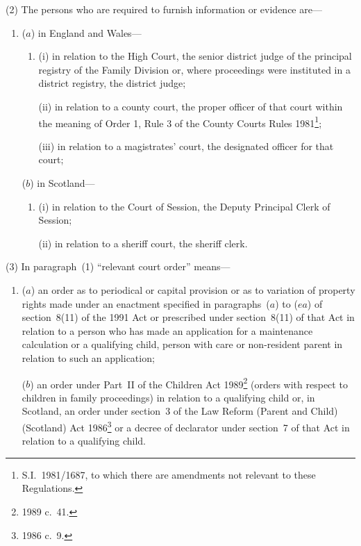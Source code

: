 \documentclass[12pt,a4paper]{article}
\begin{document}
(2) The persons who are required to furnish information or evidence are—
\begin{enumerate}\item[]
($a$) in England and Wales—
\begin{enumerate}\item[]
(i) in relation to the High Court, the senior district judge of the principal registry of the Family Division or, where proceedings were instituted in a district registry, the district judge;

(ii) in relation to a county court, the proper officer of that court within the meaning of Order 1, Rule 3 of the County Courts Rules 1981\footnote{S.I.~1981/1687, to which there are amendments not relevant to these Regulations.};

(iii) in relation to a magistrates’ court, the designated officer for that court;
\end{enumerate}

($b$) in Scotland—
\begin{enumerate}\item[]
(i) in relation to the Court of Session, the Deputy Principal Clerk of Session;

(ii) in relation to a sheriff court, the sheriff clerk.
\end{enumerate}
\end{enumerate}

(3) In paragraph~(1) “relevant court order” means—
\begin{enumerate}\item[]
($a$) an order as to periodical or capital provision or as to variation of property rights made under an enactment specified in paragraphs~($a$)  to ($ea$)  of section~8(11) of the 1991 Act or prescribed under section~8(11) of that Act in relation to a person who has made an application for a maintenance calculation or a qualifying child, person with care or non-resident parent in relation to such an application;

($b$) an order under Part~II of the Children Act 1989\footnote{1989 c.~41.} (orders with respect to children in family proceedings) in relation to a qualifying child or, in Scotland, an order under section~3 of the Law Reform (Parent and Child) (Scotland) Act 1986\footnote{1986 c.~9.} or a decree of declarator under section~7 of that Act in relation to a qualifying child.
\end{enumerate}

\end{document}
